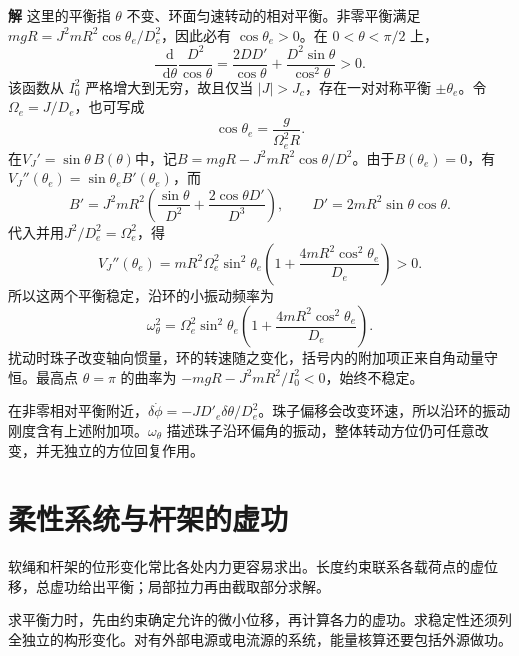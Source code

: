 \documentclass[11pt,openany,fontset=fandol]{ctexbook}
\theoremstyle{definition}\newtheorem{example}{例}[chapter]\newtheorem{exercise}{习题}[chapter]
\newcommand{\SolutionStart}{\par\medskip\ifdim\pagetotal>0pt\ifdim\dimexpr\pagegoal-\pagetotal\relax<3\baselineskip\newpage\fi\fi\noindent\textbf{解}\quad\ignorespaces}
\newenvironment{solution}{\SolutionStart}{\par\medskip}
\newcommand{\dd}{\mathop{}\!\mathrm d}\newcommand{\ee}{\mathrm e}\newcommand{\vct}[1]{\bm{#1}}
\begin{document}
\begin{solution}
这里的平衡指 $\theta$ 不变、环面匀速转动的相对平衡。非零平衡满足 $mgR=J^2mR^2\cos\theta_e/D_e^2$，因此必有 $\cos\theta_e>0$。在 $0<\theta<\pi/2$ 上，
\[
\frac{\dd}{\dd\theta}\frac{D^2}{\cos\theta}
=\frac{2DD'}{\cos\theta}+\frac{D^2\sin\theta}{\cos^2\theta}>0.
\]
该函数从 $I_0^2$ 严格增大到无穷，故且仅当 $|J|>J_c$，存在一对对称平衡 $\pm\theta_e$。令 $\Omega_e=J/D_e$，也可写成
\[
\cos\theta_e=\frac g{\Omega_e^2R}.
\]
在$V_J'=\sin\theta\,B(\theta)$中，记$B=mgR-J^2mR^2\cos\theta/D^2$。由于$B(\theta_e)=0$，有$V_J''(\theta_e)=\sin\theta_e B'(\theta_e)$，而
\[
B'=J^2mR^2\left(\frac{\sin\theta}{D^2}
+\frac{2\cos\theta D'}{D^3}\right),\qquad
D'=2mR^2\sin\theta\cos\theta.
\]
代入并用$J^2/D_e^2=\Omega_e^2$，得
\[
V_J''(\theta_e)=mR^2\Omega_e^2\sin^2\theta_e
\left(1+\frac{4mR^2\cos^2\theta_e}{D_e}\right)>0.
\]
所以这两个平衡稳定，沿环的小振动频率为
\[
\boxed{\omega_\theta^2=\Omega_e^2\sin^2\theta_e
\left(1+\frac{4mR^2\cos^2\theta_e}{D_e}\right).}
\]
扰动时珠子改变轴向惯量，环的转速随之变化，括号内的附加项正来自角动量守恒。最高点 $\theta=\pi$ 的曲率为 $-mgR-J^2mR^2/I_0^2<0$，始终不稳定。

在非零相对平衡附近，$\delta\dot\phi=-JD'_e\delta\theta/D_e^2$。珠子偏移会改变环速，所以沿环的振动刚度含有上述附加项。$\omega_\theta$ 描述珠子沿环偏角的振动，整体转动方位仍可任意改变，并无独立的方位回复作用。

\end{solution}

\section{柔性系统与杆架的虚功}
软绳和杆架的位形变化常比各处内力更容易求出。长度约束联系各载荷点的虚位移，总虚功给出平衡；局部拉力再由截取部分求解。

求平衡力时，先由约束确定允许的微小位移，再计算各力的虚功。求稳定性还须列全独立的构形变化。对有外部电源或电流源的系统，能量核算还要包括外源做功。
\end{document}
